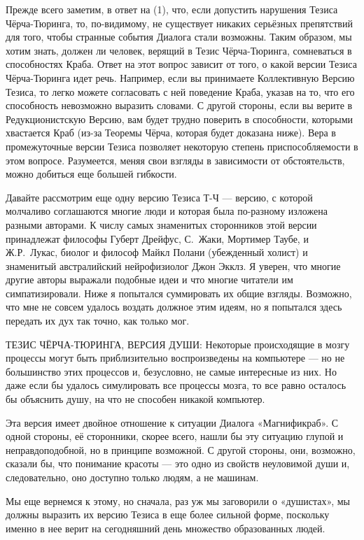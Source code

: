 \documentclass[../main.tex]{subfiles}
\begin{document}
Прежде всего заметим, в ответ на (1), что, если допустить нарушения Тезиса Чёрча-Тюринга, то, по-видимому, не существует никаких серьёзных препятствий для того, чтобы странные события Диалога стали возможны. Таким образом, мы хотим знать, должен ли человек, верящий в Тезис Чёрча-Тюринга, сомневаться в способностях Краба. Ответ на этот вопрос зависит от того, о какой версии Тезиса Чёрча-Тюринга идет речь. Например, если вы принимаете Коллективную Версию Тезиса, то легко можете согласовать с ней поведение Краба, указав на то, что его способность невозможно выразить словами. С другой стороны, если вы верите в Редукционистскую Версию, вам будет трудно поверить в способности, которыми хвастается Краб (из-за Теоремы Чёрча, которая будет доказана ниже). Вера в промежуточные версии Тезиса позволяет некоторую степень приспособляемости в этом вопросе. Разумеется, меняя свои взгляды в зависимости от обстоятельств, можно добиться еще большей гибкости.

Давайте рассмотрим еще одну версию Тезиса Т-Ч --- версию, с которой молчаливо соглашаются многие люди и которая была по-разному изложена разными авторами. К числу самых знаменитых сторонников этой версии принадлежат философы Губерт Дрейфус, С.~Жаки, Мортимер Таубе, и Ж.Р.~Лукас, биолог и философ Майкл Полани (убежденный холист) и знаменитый австралийский нейрофизиолог Джон Экклз. Я уверен, что многие другие авторы выражали подобные идеи и что многие читатели им симпатизировали. Ниже я попытался суммировать их общие взгляды. Возможно, что мне не совсем удалось воздать должное этим идеям, но я попытался здесь передать их дух так точно, как только мог.

ТЕЗИС ЧЁРЧА-ТЮРИНГА, ВЕРСИЯ ДУШИ: Некоторые происходящие в мозгу процессы могут быть приблизительно воспроизведены на компьютере --- но не большинство этих процессов и, безусловно, не самые интересные из них. Но даже если бы удалось симулировать все процессы мозга, то все равно осталось бы объяснить душу, на что не способен никакой компьютер.

Эта версия имеет двойное отношение к ситуации Диалога «Магнификраб». С одной стороны, её сторонники, скорее всего, нашли бы эту ситуацию глупой и неправдоподобной, но в принципе возможной. С другой стороны, они, возможно, сказали бы, что понимание красоты --- это одно из свойств неуловимой души и, следовательно, оно доступно только людям, а не машинам.

Мы еще вернемся к этому, но сначала, раз уж мы заговорили о «душистах», мы должны выразить их версию Тезиса в еще более сильной форме, поскольку именно в нее верит на сегодняшний день множество образованных людей.
\end{document}
